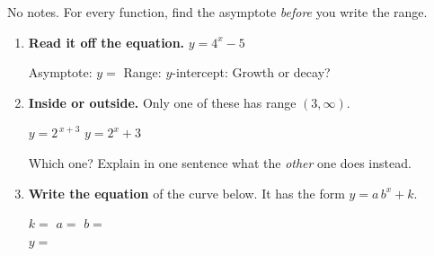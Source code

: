 \documentclass[10pt]{article}
\newcommand{\lgrid}[4]{%
  \draw[step=1, linegray!40, very thin] (#1,#3) grid (#2,#4);
  \draw[->, semithick, charcoal] (#1,0)--(#2,0) node[below right, font=\scriptsize]{$x$};
  \draw[->, semithick, charcoal] (0,#3)--(0,#4) node[left, font=\scriptsize]{$y$};}
\newcommand{\expgraph}[6]{\draw[very thick, forest, domain=#5:#6, samples=140, smooth]
  plot (\x,{(#1)*exp((#2)*((\x)-(#3)))+(#4)});}
\newcommand{\hasym}[3]{\draw[navy, dashed, semithick] (#1,#3)--(#2,#3);}
\begin{document}
\namedateperiod

\vspace{0.08in}

No notes. For every function, find the asymptote \emph{before} you write the range.

\begin{enumerate}[leftmargin=1.8em, itemsep=9pt]
  \item \textbf{Read it off the equation.} \; $y=4^{x}-5$

        \vspace{3pt}
        Asymptote: $y=$  \quad Range:  \quad
        $y$-intercept:  \quad Growth or decay? 

  \item \textbf{Inside or outside.} Only one of these has range $(3,\infty)$.

        \vspace{3pt}
        \hspace*{1.2em} $y=2^{\,x+3}$ \qquad\qquad $y=2^{x}+3$

        \vspace{3pt}
        Which one?  \; Explain in one sentence what the \emph{other} one does instead.

        \vspace{2pt}

  \item \textbf{Write the equation} of the curve below. It has the form $y=a\,b^{x}+k$.
    \begin{center}
    \begin{minipage}[c]{0.44\linewidth}
    \centering
    \end{minipage}
    \begin{minipage}[c]{0.52\linewidth}
    $k=$  \quad $a=$  \quad $b=$  \\[8pt]
    $y=$ 
    \end{minipage}
    \end{center}


\end{enumerate}
\end{document}
